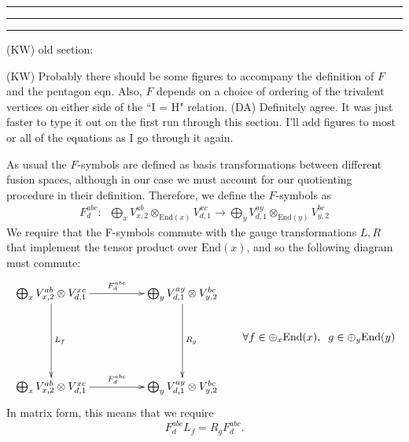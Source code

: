 \documentclass[12pt,a4paper]{article}
\newcounter{arrow}
\newcommand{\tp}{\otimes}
\newcommand\be            {\begin{equation}}
\newcommand\ee            {\end{equation}}
\newcommand{\End}{\text{End}}
\newcommand{\dave}[1]{{\color{ao(english)}\footnotesize{(DA) #1}}}
\newcommand{\kw}[1]{{\color{kwcolor}\footnotesize{(KW) #1}}}
\newcommand{\kwsep}{\bigskip\hrule\medskip\hrule\medskip\hrule\bigskip}
\begin{document}
\kwsep

\kw{old section:}

\kw{Probably there should be some figures to accompany the definition of $F$ and the pentagon eqn.
Also, $F$ depends on a choice of ordering of the trivalent vertices on either side of the ``I = H" relation.}
\dave{Definitely agree. It was just faster to type it out on the first run through this section. I'll add figures to most or all of the equations as I go through it again.}

As usual the $F$-symbols are defined as basis transformations between different fusion spaces, although in our case we must account for our quotienting procedure in their definition. Therefore, we define the $F$-symbols as
\begin{align}
F^{abc}_d: \; \; \bigoplus_x V^{ab}_{x,2} \tp_{\text{End}(x)} V^{xc}_{d,1} \rightarrow \bigoplus_y V^{ay}_{d,1} \tp_{\text{End}(y)} V^{bc}_{y,2}
\end{align}
We require that the F-symbols commute with the gauge transformations $L,R$ that implement the tensor product over $\End(x)$, and so the following diagram must commute:
\begin{align}
	\vcenter{\xymatrix @!0 @M=1mm @R=30mm @C=42mm{
		 \bigoplus_x V^{ab}_{x,2} \otimes V^{xc}_{d,1} \ar[d]^{L_{f}}\ar[r]^{F^{abc}_d}& \bigoplus_y V^{ay}_{d,1} \otimes V^{bc}_{y,2} \ar[d]^{R_{g}} \\
		\bigoplus_x V^{ab}_{x,2} \otimes V^{xc}_{d,1}  \ar[r]^{F^{abc}_d}  & \bigoplus_y V^{ay}_{d,1} \otimes V^{bc}_{y,2}	
	}} 
	{ \quad\quad \forall f \in \oplus_x \text{End}(x), \; \; g \in \oplus_y \text{End}(y)}
	\label{Fcommute}
\end{align}
In matrix form, this means that we require 
\be
F^{abc}_d  L_f=   R_g F^{abc}_d.
\ee
\end{document}
